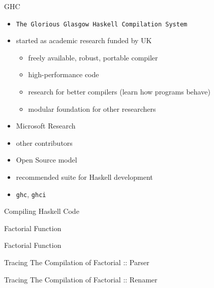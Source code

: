 \documentclass{beamer}
\begin{document}
\begin{frame}{GHC}
  \begin{itemize}
    \item \texttt{The Glorious Glasgow Haskell Compilation System}
    \pause
    \item started as academic research funded by UK
    \begin{itemize}
      \item freely available, robust, portable compiler
      \item high-performance code
      \item research for better compilers (learn how programs behave)
      \item modular foundation for other researchers
    \end{itemize}
    \pause
    \item Microsoft Research
    \item other contributors
    \item Open Source model
    \pause
    \item recommended suite for Haskell development
    \item \texttt{ghc}, \texttt{ghci}
  \end{itemize}
\end{frame}

\begin{frame}[label=comp-pipeline]{Compiling Haskell Code}
  \centering
\end{frame}

\begin{frame}{Factorial Function}
  
\end{frame}

\begin{frame}{Factorial Function}
  
\end{frame}


\begin{frame}{Tracing The Compilation of Factorial :: Parser}
  
\end{frame}


\begin{frame}{Tracing The Compilation of Factorial :: Renamer}
  
\end{frame}
\end{document}
